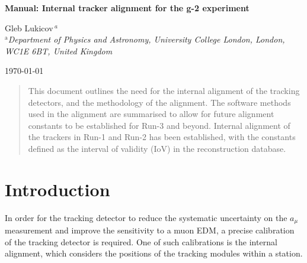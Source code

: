 \documentclass[12pt]{article}
\def\Title#1{\begin{center} {\Large {\bf #1} } \end{center}}
\begin{document}
\Title{Manual: Internal tracker alignment for the g-2 experiment}

\bigskip\bigskip


\begin{raggedright}  
Gleb Lukicov$\,^{a}$\\
{\it $^{\mathrm{a}}$Department of Physics and Astronomy, University College London, London, \\ WC1E 6BT, United Kingdom}
\bigskip\bigskip
\end{raggedright}

\begin{center}
\today
\end{center}

\null\vspace{\fill}
\begin{abstract}
This document outlines the need for the internal alignment of the tracking detectors, and the methodology of the alignment. The software methods used in the alignment are summarised to allow for future alignment constants to be established for Run-3 and beyond. Internal alignment of the trackers in Run-1 and Run-2 has been established, with the constants defined as the interval of validity (IoV) in the reconstruction database. 
\end{abstract}
\vspace{\fill}

\tableofcontents

\clearpage

\section{Introduction}
In order for the tracking detector to reduce the systematic uncertainty on the $a_{\mu}$ measurement and improve the sensitivity to a muon EDM, a precise calibration of the tracking detector is required. One of such calibrations is the internal alignment, which considers the positions of the tracking modules within a station. 
\end{document}
